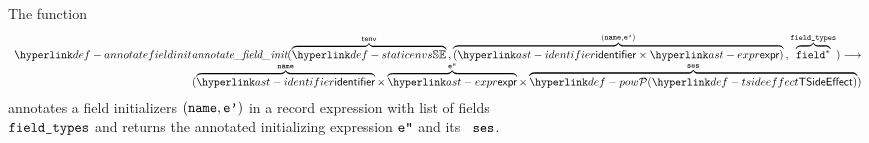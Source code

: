 \begin{mathpar}
\end{mathpar}

\hypertarget{def-annotatefieldinit}{}
The function
\[
\begin{array}{r}
  \annotatefieldinit(
    \overname{\staticenvs}{\tenv} \aslsep
    \overname{(\identifier\times\expr)}{(\name, \vep)} \aslsep
    \overname{\field^*}{\fieldtypes}
  ) \aslto \\
  (\overname{\identifier}{\name} \times \overname{\expr}{\vepp} \times \overname{\TSideEffectSet}{\vses})
\end{array}
\]
annotates a field initializers $(\name, \vep)$ in a record expression
with list of fields \\ $\fieldtypes$ and returns the annotated initializing expression $\vepp$
and its \sideeffectdescriptorterm\ $\vses$.
\ProseOtherwiseTypeError


